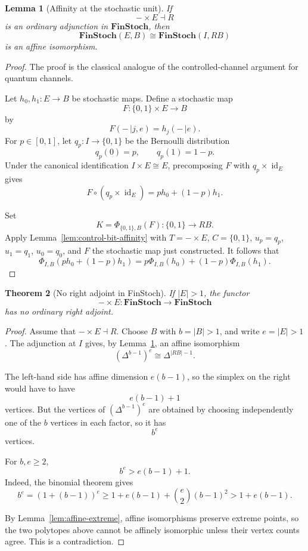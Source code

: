 \documentclass[11pt]{article}
\newtheorem{theorem}{Theorem}[section]
\newtheorem{lemma}[theorem]{Lemma}
\DeclareMathOperator{\id}{id}
\begin{document}
\begin{lemma}[Affinity at the stochastic unit]
\label{lem:finstoch-affinity}
If
\[
-\times E\dashv R
\]
is an ordinary adjunction in $\mathbf{FinStoch}$, then
\[
\mathbf{FinStoch}(E,B)\cong\mathbf{FinStoch}(I,RB)
\]
is an affine isomorphism.
\end{lemma}

\begin{proof}
The proof is the classical analogue of the controlled-channel argument for
quantum channels.

Let $h_0,h_1:E\to B$ be stochastic maps. Define a stochastic map
\[
F:\{0,1\}\times E\to B
\]
by
\[
F(-\,|j,e)=h_j(-\,|e).
\]
For $p\in[0,1]$, let $q_p:I\to\{0,1\}$ be the Bernoulli distribution
\[
q_p(0)=p,
\qquad
q_p(1)=1-p.
\]
Under the canonical identification $I\times E\cong E$, precomposing $F$
with $q_p\times\id_E$ gives
\[
F\circ(q_p\times\id_E)=ph_0+(1-p)h_1.
\]

Set
\[
K=\Phi_{\{0,1\},B}(F):\{0,1\}\to RB.
\]
Apply Lemma~\ref{lem:control-bit-affinity} with $T=-\times E$,
$C=\{0,1\}$, $u_p=q_p$, $u_1=q_1$, $u_0=q_0$, and $F$ the stochastic map
just constructed. It follows that
\[
\Phi_{I,B}(ph_0+(1-p)h_1)
=
p\Phi_{I,B}(h_0)+(1-p)\Phi_{I,B}(h_1).
\]
\end{proof}

\begin{theorem}[No right adjoint in FinStoch]
\label{thm:stoch-no-right}
If $|E|>1$, the functor
\[
-\times E:\mathbf{FinStoch}\to\mathbf{FinStoch}
\]
has no ordinary right adjoint.
\end{theorem}

\begin{proof}
Assume that $-\times E\dashv R$. Choose $B$ with $b=|B|>1$, and write
$e=|E|>1$. The adjunction at $I$ gives, by
Lemma~\ref{lem:finstoch-affinity}, an affine isomorphism
\[
(\Delta^{b-1})^e\cong\Delta^{|RB|-1}.
\]

The left-hand side has affine dimension $e(b-1)$, so the simplex on the
right would have to have
\[
e(b-1)+1
\]
vertices. But the vertices of $(\Delta^{b-1})^e$ are obtained by choosing
independently one of the $b$ vertices in each factor, so it has
\[
b^e
\]
vertices.

For $b,e\ge2$,
\[
b^e>e(b-1)+1.
\]
Indeed, the binomial theorem gives
\[
b^e=(1+(b-1))^e
\ge 1+e(b-1)+\binom{e}{2}(b-1)^2
>1+e(b-1).
\]

By Lemma~\ref{lem:affine-extreme}, affine isomorphisms preserve extreme
points, so the two polytopes above cannot be affinely isomorphic unless
their vertex counts agree. This is a contradiction.
\end{proof}
\end{document}

